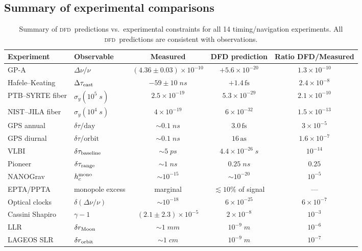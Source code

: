 \documentclass[aps,prd,twocolumn,superscriptaddress,nofootinbib,longbibliography]{revtex4-2}
\newcommand{\DFD}{\textsc{dfd}}
\newcommand{\fs}{\,\mathrm{fs}}
\newcommand{\as}{\,\mathrm{as}}
\begin{document}
\subsection{Summary of experimental comparisons}\label{sec:exp-summary}

\begin{table}[t]
\caption{Summary of \DFD\ predictions vs.\ experimental constraints for all
14 timing/navigation experiments. All \DFD\ predictions are consistent
with observations.}\label{tab:exp-summary}
\begin{ruledtabular}
\begin{tabular}{llccc}
Experiment & Observable & Measured & DFD prediction & Ratio DFD/Measured \\
\hline
GP-A & $\Delta\nu/\nu$ & $(4.36\pm0.03)\times10^{-10}$ & $+5.6\times10^{-20}$ & $1.3\times10^{-10}$ \\
Hafele--Keating & $\Delta\tau_{\rm east}$ & $-59\pm10\;\si{ns}$ & $+1.4\fs$ & $2.4\times10^{-8}$ \\
PTB--SYRTE fiber & $\sigma_y(10^5\;\si{s})$ & $2.5\times10^{-19}$ & $5.3\times10^{-29}$ & $2.1\times10^{-10}$ \\
NIST--JILA fiber & $\sigma_y(10^4\;\si{s})$ & $4\times10^{-19}$ & $6\times10^{-32}$ & $1.5\times10^{-13}$ \\
GPS annual & $\delta\tau/\text{day}$ & $\sim 0.1\;\si{ns}$ & $3.0\fs$ & $3\times10^{-5}$ \\
GPS diurnal & $\delta\tau/\text{orbit}$ & $\sim 0.1\;\si{ns}$ & $16\as$ & $1.6\times10^{-7}$ \\
VLBI & $\delta\tau_{\rm baseline}$ & $\sim 5\;\si{ps}$ & $4.4\times10^{-26}\;\si{s}$ & $10^{-14}$ \\
Pioneer & $\delta\tau_{\rm range}$ & $\sim 1\;\si{ns}$ & $0.25\;\si{ns}$ & $0.25$ \\
NANOGrav & $h_c^{\rm mono}$ & $\sim 10^{-15}$ & $\sim 10^{-20}$ & $10^{-5}$ \\
EPTA/PPTA & monopole excess & marginal & $\lesssim 10\%$ of signal & --- \\
Optical clocks & $\delta(\Delta\nu/\nu)$ & $\sim 10^{-18}$ & $6\times10^{-25}$ & $6\times10^{-7}$ \\
Cassini Shapiro & $\gamma - 1$ & $(2.1\pm2.3)\times10^{-5}$ & $2\times10^{-8}$ & $10^{-3}$ \\
LLR & $\delta r_{\rm Moon}$ & $\sim 1\;\si{mm}$ & $10^{-9}\;\si{m}$ & $10^{-6}$ \\
LAGEOS SLR & $\delta r_{\rm orbit}$ & $\sim 1\;\si{cm}$ & $10^{-9}\;\si{m}$ & $10^{-7}$ \\
\end{tabular}
\end{ruledtabular}
\end{table}
\end{document}
